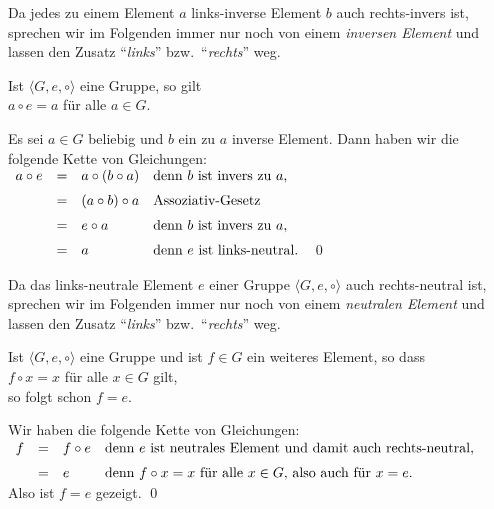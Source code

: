 \remark
Da jedes zu einem Element $a$ links-inverse Element $b$ auch rechts-invers ist, sprechen wir im Folgenden
immer nur noch von einem {\emph{\color{blue}inversen Element}} und lassen den Zusatz
``\emph{\color{blue}links}'' bzw.~``\emph{\color{blue}rechts}'' weg.  
\eoxs

\begin{Satz} \lb
  Ist $\langle G, e, \circ \rangle$ eine Gruppe, so gilt
  \\[0.2cm]
  \hspace*{1.3cm}
  $a \circ e = a$ \quad f\"{u}r alle $a \in G$.
\end{Satz}

\proof
Es sei $a \in G$ beliebig und $b$ ein zu $a$ inverse Element.  Dann haben wir die folgende Kette von
Gleichungen:
\\[0.2cm]
\hspace*{1.3cm}
$
\begin{array}[b]{lcll}
  a \circ e & = & a \circ (b \circ a) 
                & \mbox{denn $b$ ist invers zu $a$,} \\[0.2cm]
            & = & (a \circ b) \circ a
                & \mbox{Assoziativ-Gesetz} \\[0.2cm]
            & = & e \circ a
                & \mbox{denn $b$ ist invers zu $a$,} \\[0.2cm]
            & = & a 
                & \mbox{denn $e$ ist links-neutral.}
\end{array}
$
\qed
\pagebreak

\remark
Da das links-neutrale Element $e$ einer Gruppe $\langle G, e, \circ \rangle$ auch rechts-neutral ist,
sprechen wir im Folgenden
immer nur noch von einem {\emph{\color{blue}neutralen Element}} und lassen den Zusatz
``\emph{\color{blue}links}'' bzw.~``\emph{\color{blue}rechts}'' weg. 
\eoxs

\begin{Satz} \lb
  Ist $\langle G, e, \circ \rangle$ eine Gruppe und ist $f \in G$ ein weiteres  Element, so dass
  \\[0.2cm]
  \hspace*{1.3cm}
  $f \circ x = x$ \quad f\"{u}r alle $x \in G$ gilt,
  \\[0.2cm]
  so folgt schon $f = e$.
\end{Satz}

\proof
Wir haben die folgende Kette von Gleichungen:
\\[0.2cm]
\hspace*{1.3cm}
$
\begin{array}[t]{lcll}
  f & = & f \circ e & \mbox{denn $e$ ist neutrales Element und damit auch rechts-neutral,} \\[0.2cm]
    & = & e         & \mbox{denn $f \circ x = x$ f\"{u}r alle $x \in G$, also auch f\"{u}r $x = e$.} 
\end{array}
$
\\[0.2cm]
Also ist $f = e$ gezeigt. \qed

